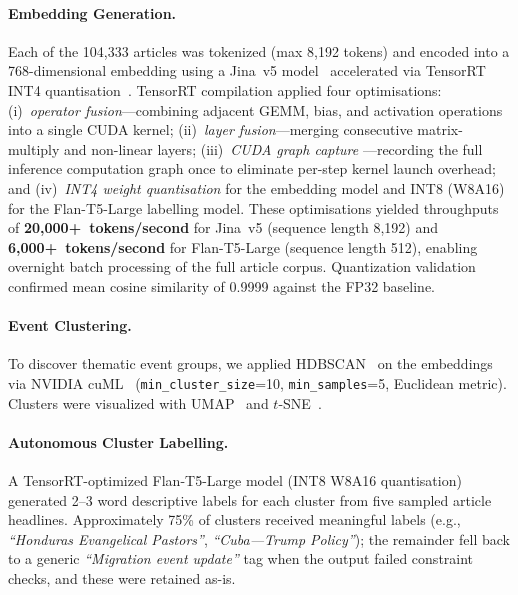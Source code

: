 \documentclass[11pt, a4paper]{article}
\begin{document}
\paragraph{Embedding Generation.}
Each of the 104,333 articles was tokenized (max 8,192 tokens) and encoded into a
768-dimensional embedding using a Jina~v5 model~\citep{gunter2024jina} accelerated via
TensorRT INT4 quantisation~\citep{tensorrt}.  TensorRT compilation applied four
optimisations: (i)~\textit{operator fusion}---combining adjacent GEMM, bias, and
activation operations into a single CUDA kernel; (ii)~\textit{layer fusion}---merging
consecutive matrix-multiply and non-linear layers; (iii)~\textit{CUDA graph capture}
---recording the full inference computation graph once to eliminate per-step kernel
launch overhead; and (iv)~\textit{INT4 weight quantisation} for the embedding model
and INT8 (W8A16) for the Flan-T5-Large labelling model.  These optimisations yielded
throughputs of \textbf{20,000+~tokens/second} for Jina~v5 (sequence length 8,192)
and \textbf{6,000+~tokens/second} for Flan-T5-Large (sequence length 512),
enabling overnight batch processing of the full article corpus.  Quantization
validation confirmed mean cosine similarity of 0.9999 against the FP32 baseline.

\paragraph{Event Clustering.}
To discover thematic event groups, we applied
HDBSCAN~\citep{campello2013} on the embeddings via NVIDIA cuML~\citep{rapids_cuml}
(\texttt{min\_cluster\_size}=10, \texttt{min\_samples}=5, Euclidean metric).  Clusters
were visualized with UMAP~\citep{mcinnes2018} and $t$-SNE~\citep{vandermaaten2008}.

\paragraph{Autonomous Cluster Labelling.}
A TensorRT-optimized Flan-T5-Large model (INT8 W8A16
quantisation)~\citep{raffel2020,tensorrt} generated 2--3 word descriptive labels for
each cluster from five sampled article headlines.  Approximately 75\% of clusters
received meaningful labels (e.g., \textit{``Honduras Evangelical Pastors''},
\textit{``Cuba---Trump Policy''}); the remainder fell back to a generic
\textit{``Migration event update''} tag when the output failed constraint checks, and
these were retained as-is.
\end{document}
